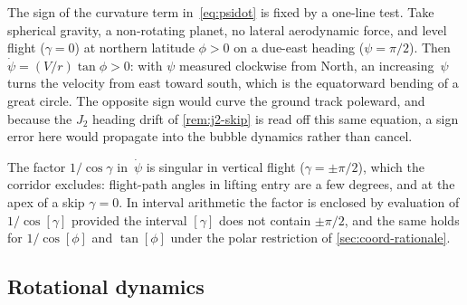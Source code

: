 \begin{remark}\label{rem:great-circle}
The sign of the curvature term in~\cref{eq:psidot} is fixed by a
one-line test. Take spherical gravity, a non-rotating planet, no lateral
aerodynamic force, and level flight ($\gamma = 0$) at northern latitude
$\phi > 0$ on a due-east heading ($\psi = \pi/2$). Then
$\dot\psi = (V/r)\tan\phi > 0$: with $\psi$ measured clockwise from North,
an increasing~$\psi$ turns the velocity from east toward south, which is
the equatorward bending of a great circle. The opposite sign would curve
the ground track poleward, and because the $J_2$ heading drift of
\cref{rem:j2-skip} is read off this same equation, a sign error here would
propagate into the bubble dynamics rather than cancel.
\end{remark}

\begin{remark}\label{rem:psi-singularity}
The factor $1/\cos\gamma$ in~$\dot\psi$ is singular in vertical flight
($\gamma = \pm\pi/2$), which the corridor excludes: flight-path angles in
lifting entry are a few degrees, and at the apex of a skip $\gamma = 0$.
In interval arithmetic the factor is enclosed by evaluation of
$1/\cos[\gamma]$ provided the interval $[\gamma]$ does not contain
$\pm\pi/2$, and the same holds for $1/\cos[\phi]$ and $\tan[\phi]$ under
the polar restriction of \cref{sec:coord-rationale}.
\end{remark}


\subsection{Rotational dynamics}\label{sec:rot-dyn}

